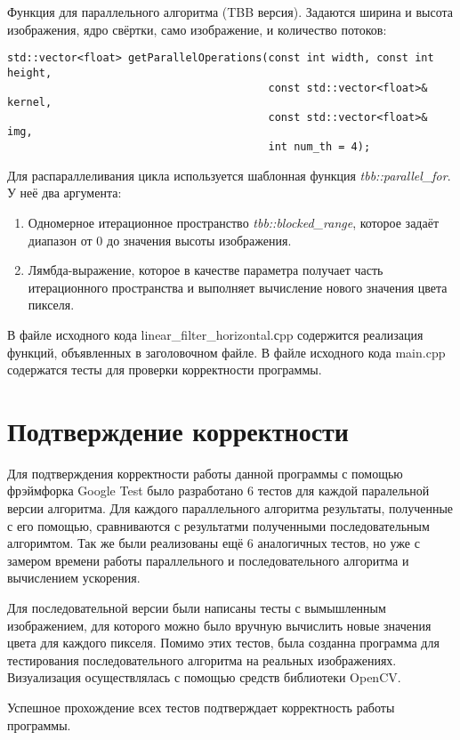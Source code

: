 \documentclass{report}
\begin{document}
\par Функция для параллельного алгоритма (TBB версия). Задаются ширина и высота изображения, ядро свёртки, само изображение, и количество потоков:
\begin{lstlisting}
std::vector<float> getParallelOperations(const int width, const int height,
                                         const std::vector<float>& kernel,
                                         const std::vector<float>& img,
                                         int num_th = 4);
\end{lstlisting}
Для распараллеливания цикла используется  шаблонная функция \textit{tbb::parallel\_for}. У неё два аргумента:
\begin{enumerate}
    \item Одномерное итерационное пространство \textit{tbb::blocked\_range}, которое задаёт диапазон от 0 до значения высоты изображения.
	\item Лямбда-выражение, которое в качестве параметра получает часть итерационного пространства и выполняет вычисление нового значения цвета пикселя.
\end{enumerate}
\par В файле исходного кода linear\_filter\_horizontal.сpp содержится реализация функций, объявленных в заголовочном файле. В файле исходного кода main.cpp содержатся тесты для проверки корректности программы.

\newpage

\section*{Подтверждение корректности}
Для подтверждения корректности работы данной программы с помощью фрэймфорка Google Test было разработано 6 тестов для каждой паралельной версии алгоритма. Для каждого параллельного алгоритма результаты, полученные с его помощью, сравниваются с результатми полученными последовательным алгоримтом. Так же были реализованы ещё 6 аналогичных тестов, но уже с замером времени работы параллельного и последовательного алгоритма и вычислением ускорения.
\par Для последовательной версии были написаны тесты с вымышленным изображением, для которого можно было вручную вычислить новые значения цвета для каждого пикселя. Помимо этих тестов, была созданна программа для тестирования последовательного алгоритма на реальных изображениях. Визуализация осуществлялась с помощью средств библиотеки OpenCV. 
\par Успешное прохождение всех тестов подтверждает корректность работы программы.
\newpage
\end{document}
